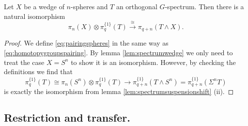 \begin{lem}\label{lem:pairing}
Let $X$ be a wedge of $n$-spheres and $T$ an orthogonal $G$-spectrum. 
Then there is a natural isomorphism
\begin{equation}\label{eq:pairingspheres}
\pi_{n}(X)\otimes \pi_q^{\{1\}}(T)\xrightarrow{\cong} \pi_{ q + n}(T\wedge X).
\end{equation}
\end{lem}
\begin{proof}
We define \eqref{eq:pairingspheres} in the same way as \eqref{eq:homotopygroupspairing}.
By lemma \ref{lem:spectrumwedge} we only need to treat the case $X = S^n$
to show it is an isomorphism. However, by checking the definitions we find
that 
\[
\pi_q^{\{1\}}(T)\cong \pi_n(S^n)\otimes \pi_q^{\{1\}}(T)\to \pi_{q+n}^{\{1\}} (T\wedge S^n) =  \pi_{q+n}^{\{1\}} (\Sigma^n T)
\]
is exactly the isomorphism from lemma \ref{lem:spectrumsuspensionshift} (ii).
\end{proof}
\subsection{Restriction and transfer.}



